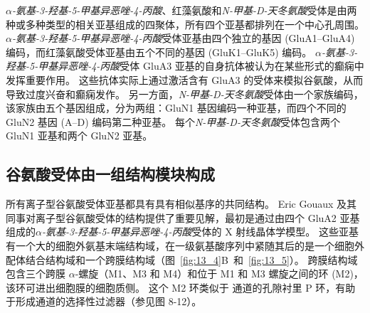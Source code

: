 \textit{$\alpha$-氨基-3-羟基-5-甲基异恶唑-4-丙酸}、红藻氨酸和\textit{N-甲基-D-天冬氨酸}受体是由两种或多种类型的相关亚基组成的四聚体，所有四个亚基都排列在一个中心孔周围。
\textit{$\alpha$-氨基-3-羟基-5-甲基异恶唑-4-丙酸}受体亚基由四个独立的基因 (GluA1–GluA4) 编码，而红藻氨酸受体亚基由五个不同的基因 (GluK1–GluK5) 编码。
\textit{$\alpha$-氨基-3-羟基-5-甲基异恶唑-4-丙酸}受体 GluA3 亚基的自身抗体被认为在某些形式的癫痫中发挥重要作用。
这些抗体实际上通过激活含有 GluA3 的受体来模拟谷氨酸，从而导致过度兴奋和癫痫发作。
另一方面，\textit{N-甲基-D-天冬氨酸}受体由一个家族编码，该家族由五个基因组成，分为两组：GluN1 基因编码一种亚基，而四个不同的 GluN2 基因 (A–D) 编码第二种亚基。
每个\textit{N-甲基-D-天冬氨酸}受体包含两个 GluN1 亚基和两个 GluN2 亚基。



\subsection{谷氨酸受体由一组结构模块构成}

所有离子型谷氨酸受体亚基都具有具有相似基序的共同结构。
Eric Gouaux 及其同事对离子型谷氨酸受体的结构提供了重要见解，最初是通过由四个 GluA2 亚基组成的\textit{$\alpha$-氨基-3-羟基-5-甲基异恶唑-4-丙酸}受体的 X 射线晶体学模型。
这些亚基有一个大的细胞外氨基末端结构域，在一级氨基酸序列中紧随其后的是一个细胞外配体结合结构域和一个跨膜结构域（图~\ref{fig:13_4}B~和~\ref{fig:13_5}）。
跨膜结构域包含三个跨膜 $\alpha$-螺旋（M1、M3 和 M4）和位于 M1 和 M3 螺旋之间的环 (M2)，该环可进出细胞膜的细胞质侧。
这个 M2 环类似于  通道的孔隙衬里 P 环，有助于形成通道的选择性过滤器（参见图 8-12）。


